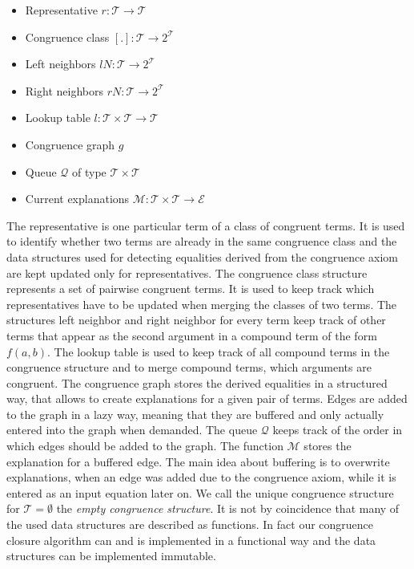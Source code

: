 \begin{itemize}
	\item Representative $r: \mathcal{T} \rightarrow \mathcal{T}$
	\item Congruence class $[.]: \mathcal{T} \rightarrow 2^\mathcal{T}$
	\item Left neighbors $lN: \mathcal{T} \rightarrow 2^\mathcal{T}$
	\item Right neighbors $rN: \mathcal{T} \rightarrow 2^\mathcal{T}$
	\item Lookup table $l: \mathcal{T} \times \mathcal{T} \rightarrow \mathcal{T}$
	\item Congruence graph $g$
	\item Queue $\mathcal{Q}$ of type $\mathcal{T} \times \mathcal{T}$
	\item Current explanations $\mathcal{M}: \mathcal{T} \times \mathcal{T} \rightarrow \mathcal{E}$
\end{itemize}

The representative is one particular term of a class of congruent terms.
It is used to identify whether two terms are already in the same congruence class and the data structures used for detecting equalities derived from the congruence axiom are kept updated only for representatives.
The congruence class structure represents a set of pairwise congruent terms.
It is used to keep track which representatives have to be updated when merging the classes of two terms.
The structures left neighbor and right neighbor for every term keep track of other terms that appear as the second argument in a compound term of the form $f(a,b)$.
The lookup table is used to keep track of all compound terms in the congruence structure and to merge compound terms, which arguments are congruent.
The congruence graph stores the derived equalities in a structured way, that allows to create explanations for a given pair of terms.
Edges are added to the graph in a lazy way, meaning that they are buffered and only actually entered into the graph when demanded.
The queue $\mathcal{Q}$ keeps track of the order in which edges should be added to the graph.
The function $\mathcal{M}$ stores the explanation for a buffered edge.
The main idea about buffering is to overwrite explanations, when an edge was added due to the congruence axiom, while it is entered as an input equation later on.
We call the unique congruence structure for $\mathcal{T} = \emptyset$ the \emph{empty congruence structure}.
It is not by coincidence that many of the used data structures are described as functions.
In fact our congruence closure algorithm can and is implemented in a functional way and the data structures can be implemented immutable.

